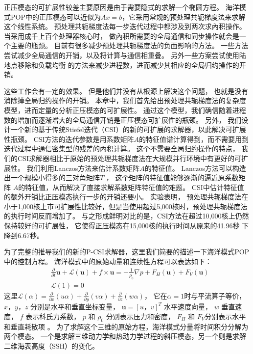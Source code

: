  
正压模态的可扩展性较差主要原因是由于需要隐式的求解一个椭圆方程。 
海洋模式POP中的正压模态可以近似为$Ax=b$，它采用常规的预处理共轭梯度法来求解这个线性系统。 
预处理共轭梯度法每一步迭代过程中都涉及到两次求內积操作。 
当采用成千上百个处理器核心时， 做內积所需要的全局通信和同步操作就会是一个主要的瓶颈。 
目前有很多减少预处理共轭梯度法的负面影响的方法。 
一些方法尝试减少全局通信的开销\cite{dAzevedo1999lapack}，以及将计算与通信相重叠\cite{beare1997optimisation}。 
另外一些方案尝试使用陆地点移除和负载均衡\cite{dennis2007inverse, dennis2008scaling} 的方法来减少进程数，进而减少其相应的全局归约操作的开销。 


这些工作会有一定的效果。 
但是他们并没有从根源上解决这个问题， 也就是没有消除掉全局归约操作的开销。 
本章中，我们首先给出预处理共轭梯度法的复杂度模型，进而定量的分析正压模态的可扩展性。 
通过这个模型，我们确信随着进程数的增加而逐渐增大的全局通信开销是正压模态可扩展性的瓶颈。 
另外，  我们设计一个新的基于传统Stiefel迭代（CSI）的新的可扩展的求解器，以此解决可扩展性瓶颈。 
CSI方法的迭代参数是用系数矩阵$A$的特征值谱计算得到，而不需要用到迭代过程中通信密集型的残差的內积计算。
这个不需要全局归约操作的特点， 我们的CSI求解器相比于原始的预处理共轭梯度法在大规模并行环境中有更好的可扩展性。  
我们利用Lanczos方法来估计系数矩阵$A$的特征值。 
Lanczos方法可以构造出一个规模小得多的三对角矩阵$T$ ， 这个矩阵的特征值能够逐渐的逼近原系数矩阵 $A$的特征值，从而解决了直接求解系数矩阵特征值的难题。 
CSI中估计特征值的额外开销比正压模态执行一步的开销还要小。 
实验表明， 预处理共轭梯度法在小于1,000核上市可扩展性比较好，但是当使用超过5,000核时，预处理共轭梯度法的执行时间反而增加了。 
与之形成鲜明对比的是，CSI方法在超过10,000核上仍然保持较好的可扩展性， 它使得正压模态在15,000核的执行时间从原来的41.96秒 下降到6.67秒。 


为了完整的推导我们的新的P-CSI求解器，这里我们简要的描述一下海洋模式POP中的控制方程。
海洋模式中的原始动量和连续性方程可以表达如下：
\begin{align}
&\frac{\partial }{\partial t} \textbf{u} +\mathcal{L}(\textbf{u}) + f\times \textbf{u} = - \frac{1}{\rho_0}\nabla p +F_H(\textbf{u}) +F_V(\textbf{u}) \label{eq:momen}\\
&\mathcal{L}(1) = 0 \label{eq:continuous}
\end{align}
这里$\mathcal{L}(\alpha ) = \frac{\partial }{\partial x} (u\alpha)  +\frac{\partial }{\partial y} (v\alpha) +\frac{\partial }{\partial z} (w\alpha)$， 它在$\alpha =1$时与平流算子等价， $x，y，z$ 分别是水平和垂直坐标变量， $\textbf{u} = [u，v]^T$ 水平速度向量， $w$ 垂直速度， $f$ 表示科氏力系数，  $p$ 和 $\rho_0$ 分别表示压力和密度， $F_H$ 和 $F_V$分别表示水平和垂直耗散项 \cite{smith2010parallel}。  
为了求解这个三维的原始方程，海洋模式分量将时间积分分解为两个模态。 一个是求解三维动力学和热动力学过程的斜压模态，另一个则是求解二维海表高度（SSH）的变化。

